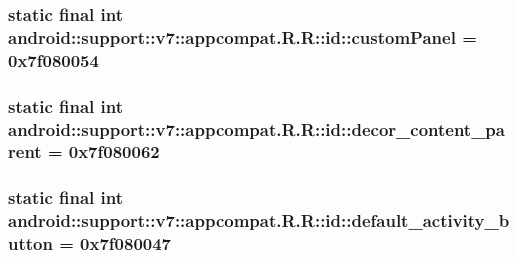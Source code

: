 \hypertarget{classandroid_1_1support_1_1v7_1_1appcompat_1_1_r_1_1id_effb8099c138de1af12775a840692200}{
\subsubsection[{customPanel}]{\setlength{\rightskip}{0pt plus 5cm}static final int android::support::v7::appcompat.R.R::id::customPanel = 0x7f080054}}
\label{classandroid_1_1support_1_1v7_1_1appcompat_1_1_r_1_1id_effb8099c138de1af12775a840692200}


\hypertarget{classandroid_1_1support_1_1v7_1_1appcompat_1_1_r_1_1id_456e2eb65ba41111a6364aa051703eec}{
\subsubsection[{decor\_\-content\_\-parent}]{\setlength{\rightskip}{0pt plus 5cm}static final int android::support::v7::appcompat.R.R::id::decor\_\-content\_\-parent = 0x7f080062}}
\label{classandroid_1_1support_1_1v7_1_1appcompat_1_1_r_1_1id_456e2eb65ba41111a6364aa051703eec}


\hypertarget{classandroid_1_1support_1_1v7_1_1appcompat_1_1_r_1_1id_e2dc472ed8408880a93e0b6488ec3d8c}{
\subsubsection[{default\_\-activity\_\-button}]{\setlength{\rightskip}{0pt plus 5cm}static final int android::support::v7::appcompat.R.R::id::default\_\-activity\_\-button = 0x7f080047}}
\label{classandroid_1_1support_1_1v7_1_1appcompat_1_1_r_1_1id_e2dc472ed8408880a93e0b6488ec3d8c}


